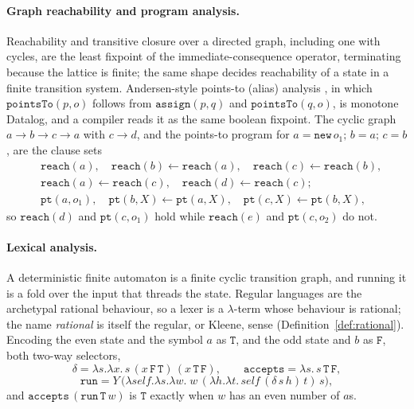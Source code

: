 \paragraph{Graph reachability and program analysis.}
Reachability and transitive closure over a directed graph, including one with cycles, are the least
fixpoint of the immediate-consequence operator, terminating because the lattice is finite; the same
shape decides reachability of a state in a finite transition system. Andersen-style points-to (alias)
analysis \cite{andersen1994-program-analysis-c, bravenboer2009-doop}, in which $\mathtt{pointsTo}(p,o)$ follows from
$\mathtt{assign}(p,q)$ and $\mathtt{pointsTo}(q,o)$, is monotone Datalog, and a compiler reads it as
the same boolean fixpoint. The cyclic graph $a\to b\to c\to a$ with $c\to d$, and the points-to
program for $a=\mathtt{new}\,o_1;\,b=a;\,c=b$, are the clause sets
\[
  \begin{aligned}
    &\mathtt{reach}(a),\quad \mathtt{reach}(b)\leftarrow\mathtt{reach}(a),\quad
    \mathtt{reach}(c)\leftarrow\mathtt{reach}(b),\\
    &\mathtt{reach}(a)\leftarrow\mathtt{reach}(c),\quad \mathtt{reach}(d)\leftarrow\mathtt{reach}(c);\\
    &\mathtt{pt}(a,o_1),\quad \mathtt{pt}(b,X)\leftarrow\mathtt{pt}(a,X),\quad
    \mathtt{pt}(c,X)\leftarrow\mathtt{pt}(b,X),
  \end{aligned}
\]
so $\mathtt{reach}(d)$ and $\mathtt{pt}(c,o_1)$ hold while $\mathtt{reach}(e)$ and $\mathtt{pt}(c,o_2)$
do not.

\paragraph{Lexical analysis.}
A deterministic finite automaton is a finite cyclic transition graph, and running it is a fold over
the input that threads the state. Regular languages are the archetypal rational behaviour, so a lexer
is a $\lambda$-term whose behaviour is rational; the name \emph{rational} is itself the regular, or
Kleene, sense (Definition~\ref{def:rational}). Encoding the even state and the symbol $a$ as
$\mathtt{T}$, and the odd state and $b$ as $\mathtt{F}$, both two-way selectors,
\[
  \delta = \lambda s.\lambda x.\,s\,(x\,\mathtt{F}\,\mathtt{T})\,(x\,\mathtt{T}\,\mathtt{F}), \qquad
  \mathtt{accepts} = \lambda s.\,s\,\mathtt{T}\,\mathtt{F},
\]
\[
  \mathtt{run} = Y\,\big(\lambda\mathit{self}.\lambda s.\lambda w.\;
  w\,(\lambda h.\lambda t.\,\mathit{self}\,(\delta\,s\,h)\,t)\,s\big),
\]
and $\mathtt{accepts}\,(\mathtt{run}\,\mathtt{T}\,w)$ is $\mathtt{T}$ exactly when $w$ has an even
number of $a$s.


